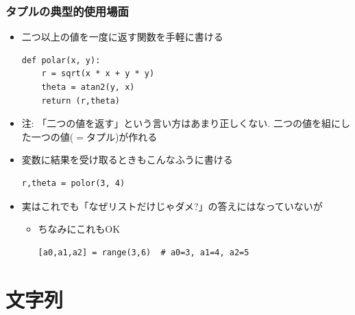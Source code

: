 \documentclass[10pt,dvipdfmx]{beamer}
\newcommand{\ao}[1]{{\color{blue}#1}}
\begin{document}
\begin{frame}[fragile]
\frametitle{タプルの典型的使用場面}
\begin{itemize}
\item 二つ以上の値を一度に返す関数を手軽に書ける
\begin{lstlisting}
def polar(x, y):
    r = sqrt(x * x + y * y)
    theta = atan2(y, x)
    return (r,theta)
\end{lstlisting}
\item 注: {\small 
「二つの値を返す」という言い方はあまり正しくない.
\ao{二つの値を組にした一つの値($=$タプル)}が作れる}

\item 変数に結果を受け取るときもこんなふうに書ける
\begin{lstlisting}
r,theta = polor(3, 4)
\end{lstlisting}

\item 実はこれでも「なぜリストだけじゃダメ?」の答えにはなっていないが
  \begin{itemize}
  \item ちなみにこれもOK
\begin{lstlisting}
[a0,a1,a2] = range(3,6)  # a0=3, a1=4, a2=5
\end{lstlisting}
\end{itemize}

\end{itemize}
\end{frame}


\section{文字列}
\end{document}
